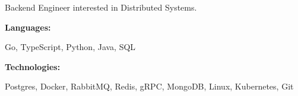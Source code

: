 \documentclass[9pt]{developercv} %
\begin{document}
\begin{minipage}[t]{0.46\textwidth}
	\vspace{-6pt}
	Backend Engineer interested in Distributed Systems.
	\vspace{-6pt}
\end{minipage}
\hfill %
\begin{minipage}[t]{0.465\textwidth}
	\vspace{-6pt}

	\begin{minipage}[t]{0.2\textwidth}
		\textbf{Languages:}
	\end{minipage}
	\hfill
	\begin{minipage}[t]{0.73\textwidth}
		Go, TypeScript, Python, Java, SQL
	\end{minipage}
	\vspace{4mm}

	\begin{minipage}[t]{0.2\textwidth}
		\textbf{Technologies:}
	\end{minipage}
	\hfill
	\begin{minipage}[t]{0.73\textwidth}
		Postgres, Docker, RabbitMQ, Redis, gRPC, MongoDB, Linux, Kubernetes, Git
	\end{minipage}

\end{minipage}
\end{document}
